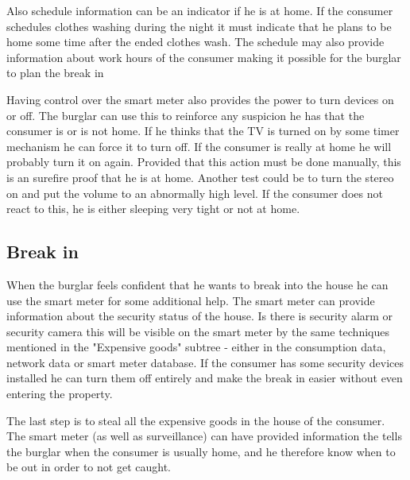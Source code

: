 Also schedule information can be an indicator if he is at home.
If the consumer schedules clothes washing during the night it must indicate that he plans to be home some time after the ended clothes wash.
The schedule may also provide information about work hours of the consumer making it possible for the burglar to plan the break in

Having control over the smart meter also provides the power to turn devices on or off.
The burglar can use this to reinforce any suspicion he has that the consumer is or is not home.
If he thinks that the TV is turned on by some timer mechanism he can force it to turn off.
If the consumer is really at home he will probably turn it on again.
Provided that this action must be done manually, this is an surefire proof that he is at home.
Another test could be to turn the stereo on and put the volume to an abnormally high level.
If the consumer does not react to this, he is either sleeping very tight or not at home.

\subsection{Break in}
When the burglar feels confident that he wants to break into the house he can use the smart meter for some additional help.
The smart meter can provide information about the security status of the house.
Is there is security alarm or security camera this will be visible on the smart meter by the same techniques mentioned in the "Expensive goods" subtree - either in the consumption data, network data or smart meter database.
If the consumer has some security devices installed he can turn them off entirely and make the break in easier without even entering the property.

The last step is to steal all the expensive goods in the house of the consumer.
The smart meter (as well as surveillance) can have provided information the tells the burglar when the consumer is usually home, and he therefore know when to be out in order to not get caught.
